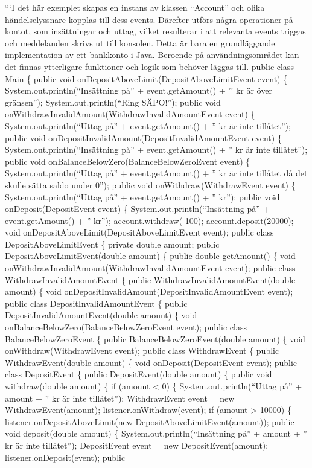 ```I det här exemplet skapas en instans av klassen ``Account'' och olika
händelselyssnare kopplas till dess events. Därefter utförs några
operationer på kontot, som insättningar och uttag, vilket resulterar i
att relevanta events triggas och meddelanden skrivs ut till konsolen.
Detta är bara en grundläggande implementation av ett bankkonto i Java.
Beroende på användningsområdet kan det finnas ytterligare funktioner och
logik som behöver läggas till. public class Main \{ public void
onDepositAboveLimit(DepositAboveLimitEvent event) \{
System.out.println(``Insättning på'' + event.getAmount() + '' kr är över
gränsen''); System.out.println(``Ring SÄPO!''); public void
onWithdrawInvalidAmount(WithdrawInvalidAmountEvent event) \{
System.out.println(``Uttag på'' + event.getAmount() + '' kr är inte
tillåtet''); public void
onDepositInvalidAmount(DepositInvalidAmountEvent event) \{
System.out.println(``Insättning på'' + event.getAmount() + '' kr är inte
tillåtet''); public void onBalanceBelowZero(BalanceBelowZeroEvent event)
\{ System.out.println(``Uttag på'' + event.getAmount() + '' kr är inte
tillåtet då det skulle sätta saldo under 0''); public void
onWithdraw(WithdrawEvent event) \{ System.out.println(``Uttag på'' +
event.getAmount() + '' kr''); public void onDeposit(DepositEvent event)
\{ System.out.println(``Insättning på'' + event.getAmount() + '' kr'');
account.withdraw(-100); account.deposit(20000); void
onDepositAboveLimit(DepositAboveLimitEvent event); public class
DepositAboveLimitEvent \{ private double amount; public
DepositAboveLimitEvent(double amount) \{ public double getAmount() \{
void onWithdrawInvalidAmount(WithdrawInvalidAmountEvent event); public
class WithdrawInvalidAmountEvent \{ public
WithdrawInvalidAmountEvent(double amount) \{ void
onDepositInvalidAmount(DepositInvalidAmountEvent event); public class
DepositInvalidAmountEvent \{ public DepositInvalidAmountEvent(double
amount) \{ void onBalanceBelowZero(BalanceBelowZeroEvent event); public
class BalanceBelowZeroEvent \{ public BalanceBelowZeroEvent(double
amount) \{ void onWithdraw(WithdrawEvent event); public class
WithdrawEvent \{ public WithdrawEvent(double amount) \{ void
onDeposit(DepositEvent event); public class DepositEvent \{ public
DepositEvent(double amount) \{ public void withdraw(double amount) \{ if
(amount \textless{} 0) \{ System.out.println(``Uttag på'' + amount + ''
kr är inte tillåtet''); WithdrawEvent event = new WithdrawEvent(amount);
listener.onWithdraw(event); if (amount \textgreater{} 10000) \{
listener.onDepositAboveLimit(new DepositAboveLimitEvent(amount)); public
void deposit(double amount) \{ System.out.println(``Insättning på'' +
amount + '' kr är inte tillåtet''); DepositEvent event = new
DepositEvent(amount); listener.onDeposit(event); public

